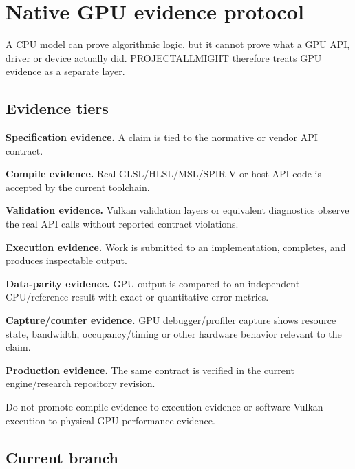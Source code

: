 \hypertarget{appendix-1680333ac796}{}\label{referencestart:appendix-1680333ac796}
\section{Native GPU evidence protocol}\label{appendix-1680333ac796-native-gpu-evidence-protocol}

\hypertarget{appendix-1680333ac796-native-gpu-evidence-protocol}{}

A CPU model can prove algorithmic logic, but it cannot prove what a GPU API, driver or device actually did. PROJECTALLMIGHT therefore treats GPU evidence as a separate layer.

\subsection{Evidence tiers}\label{appendix-1680333ac796-evidence-tiers}

\hypertarget{appendix-1680333ac796-evidence-tiers}{}

\textbf{Specification evidence.} A claim is tied to the normative or vendor API contract.

\textbf{Compile evidence.} Real GLSL/HLSL/MSL/SPIR-V or host API code is accepted by the current toolchain.

\textbf{Validation evidence.} Vulkan validation layers or equivalent diagnostics observe the real API calls without reported contract violations.

\textbf{Execution evidence.} Work is submitted to an implementation, completes, and produces inspectable output.

\textbf{Data-parity evidence.} GPU output is compared to an independent CPU/reference result with exact or quantitative error metrics.

\textbf{Capture/counter evidence.} GPU debugger/profiler capture shows resource state, bandwidth, occupancy/timing or other hardware behavior relevant to the claim.

\textbf{Production evidence.} The same contract is verified in the current engine/research repository revision.

Do not promote compile evidence to execution evidence or software-Vulkan execution to physical-GPU performance evidence.

\subsection{Current branch}\label{appendix-1680333ac796-current-branch}

